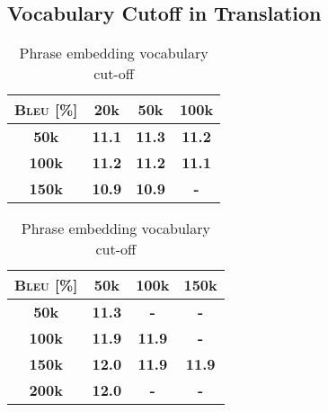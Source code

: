 \subsection{Vocabulary Cutoff in Translation}
\begin{table}[h]
	\parbox{.5\linewidth}{
		\centering
		\caption{Word embedding vocabulary cut-off}
		\begin{tabular}{>{\bfseries}c >{\bfseries}c >{\bfseries}c >{\bfseries}c } 
			\hline
			\textsc{Bleu} [\%]	& 20k & 50k & 100k \\
			\hline
			50k &	11.1  & \leavevmode\color{blue}11.3 & 11.2  \\ 
			\hline
			100k&	11.2  & 11.2 & 11.1 \\ 			
			\hline
			150k&	10.9 & 10.9 & - \\
			\hline
		\end{tabular}
		
	}
	\hfill
	\parbox{.5\linewidth}{
		\centering
		\caption{Phrase embedding vocabulary cut-off}
		\begin{tabular}{>{\bfseries}c >{\bfseries}c >{\bfseries}c >{\bfseries}c } 
			\hline
			\textsc{Bleu} [\%]	& 50k & 100k & 150k \\
			\hline
			50k &	11.3  & - & -  \\ 
			\hline
			100k&	11.9  & 11.9 & - \\ 			
			\hline
			150k&	\leavevmode\color{blue}12.0 & 11.9 & 11.9 \\
			\hline
			200k & 12.0 & - & - \\
			\hline
		\end{tabular}
		
	}
\end{table}